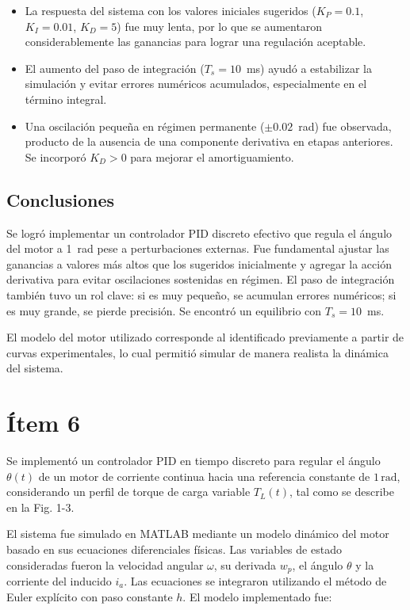 \documentclass{article}
\begin{document}
\begin{itemize}
    \item La respuesta del sistema con los valores iniciales sugeridos ($K_P = 0.1$, $K_I = 0.01$, $K_D = 5$) fue muy lenta, por lo que se aumentaron considerablemente las ganancias para lograr una regulación aceptable.
    \item El aumento del paso de integración ($T_s = 10$~ms) ayudó a estabilizar la simulación y evitar errores numéricos acumulados, especialmente en el término integral.
    \item Una oscilación pequeña en régimen permanente ($\pm 0.02$~rad) fue observada, producto de la ausencia de una componente derivativa en etapas anteriores. Se incorporó $K_D > 0$ para mejorar el amortiguamiento.
\end{itemize}

\subsection*{Conclusiones}

Se logró implementar un controlador PID discreto efectivo que regula el ángulo del motor a 1~rad pese a perturbaciones externas. Fue fundamental ajustar las ganancias a valores más altos que los sugeridos inicialmente y agregar la acción derivativa para evitar oscilaciones sostenidas en régimen. El paso de integración también tuvo un rol clave: si es muy pequeño, se acumulan errores numéricos; si es muy grande, se pierde precisión. Se encontró un equilibrio con $T_s = 10$~ms.

El modelo del motor utilizado corresponde al identificado previamente a partir de curvas experimentales, lo cual permitió simular de manera realista la dinámica del sistema.
\section{Ítem 6}

Se implementó un controlador PID en tiempo discreto para regular el ángulo \(\theta(t)\) de un motor de corriente continua hacia una referencia constante de \(1\,\text{rad}\), considerando un perfil de torque de carga variable \(T_L(t)\), tal como se describe en la Fig. 1-3.

El sistema fue simulado en MATLAB mediante un modelo dinámico del motor basado en sus ecuaciones diferenciales físicas. Las variables de estado consideradas fueron la velocidad angular \(\omega\), su derivada \(w_p\), el ángulo \(\theta\) y la corriente del inducido \(i_a\). Las ecuaciones se integraron utilizando el método de Euler explícito con paso constante \(h\). El modelo implementado fue:
\end{document}
